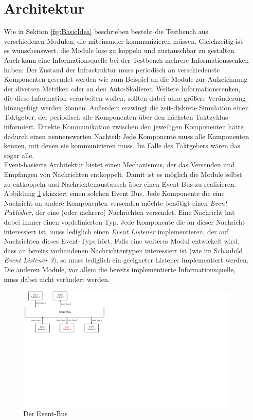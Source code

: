 \section{Architektur}
\label{sec:Architektur und Technologien:Architektur}
Wie in Sektion \ref{fig:BasicIdea} beschrieben besteht die Testbench aus verschiedenen Modulen, die miteinander kommunizieren müssen. Gleichzeitig ist es wünschenswert, die Module lose zu koppeln und austauschbar zu gestalten. Auch kann eine Informationsquelle bei der Testbench mehrere Informationssenken haben: Der Zustand der Infrastruktur muss periodisch an verschiedenste Komponenten gesendet werden wie zum Beispiel an die Module zur Aufzeichnung der diversen Metriken oder an den Auto-Skalierer. Weitere Informationssenken, die diese Information verarbeiten wollen, sollten dabei ohne größere Veränderung hinzugefügt werden können. Außerdem erzwingt die zeit-diskrete Simulation einen Taktgeber, der periodisch alle Komponenten über den nächsten Taktzyklus informiert. Direkte Kommunikation zwischen den jeweiligen Komponenten hätte dadurch einen nennenswerten Nachteil: Jede Komponente muss alle Komponenten kennen, mit denen sie kommunizieren muss. Im Falle des Taktgebers wären das sogar alle. \\
Event-basierte Architektur bietet einen Mechanismus, der das Versenden und Empfangen von Nachrichten entkoppelt. Damit ist es möglich die Module selbst zu entkoppeln und Nachrichtenaustausch über einen Event-Bus zu realisieren. Abbildung \ref{fig:EventBus} skizziert einen solchen Event Bus. Jede Komponente die eine Nachricht an andere Komponenten versenden möchte benötigt einen \textit{Event Publisher}, der eine (oder mehrere) Nachrichten versendet. Eine Nachricht hat dabei immer einen vordefinierten Typ. Jede Komponente die an dieser Nachricht interessiert ist, muss lediglich einen \textit{Event Listener} implementieren, der auf Nachrichten dieses Event-Typs hört. Falls eine weiteres Modul entwickelt wird, dass an bereits vorhandenen Nachrichtentypen interessiert ist (wie im Schaubild \textit{Event Listener 3}), so muss lediglich ein geeigneter Listener implementiert werden. Die anderen Module, vor allem die bereits implementierte Informationsquelle, muss dabei nicht verändert werden.  


\begin{figure}[t]
	\includegraphics[width=\textwidth, trim={0cm 11.5cm 19cm 0cm}]{img/EventBus.pdf}
	\caption{Der Event-Bus}
	\label{fig:EventBus}
\end{figure}
